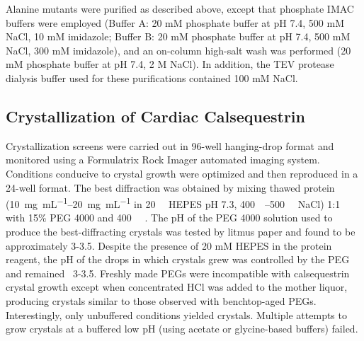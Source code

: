 Alanine mutants were purified as described above, except that phosphate IMAC buffers were employed (Buffer A: 20 mM phosphate buffer at pH 7.4, 500 mM NaCl, 10 mM imidazole; Buffer B: 20 mM phosphate buffer at pH 7.4, 500 mM NaCl, 300 mM imidazole), and an on-column high-salt wash was performed (20 mM phosphate buffer at pH 7.4, 2 M NaCl). In addition, the TEV protease dialysis buffer used for these purifications contained 100 mM NaCl.

\subsection*{Crystallization of Cardiac Calsequestrin}
Crystallization screens were carried out in 96-well hanging-drop format and monitored using a Formulatrix Rock Imager automated imaging system. Conditions conducive to crystal growth were optimized and then reproduced in a 24-well format. The best diffraction was obtained by mixing thawed protein (\SIrange[range-units = single]{10}{20}{\mg\per\milli\liter} in \SI{20}{\milli\Molar} HEPES pH 7.3, \SIrange[range-units = single]{400}{500}{\milli\Molar} NaCl) 1:1 with 15\% PEG 4000 and \SI{400}{\milli\Molar} . The pH of the PEG 4000 solution used to produce the best-diffracting crystals was tested by litmus paper and found to be approximately 3-3.5. Despite the presence of 20 mM HEPES in the protein reagent, the pH of the drops in which crystals grew was controlled by the PEG and remained ~3-3.5. Freshly made PEGs were incompatible with calsequestrin crystal growth except when concentrated HCl was added to the mother liquor, producing crystals similar to those observed with benchtop-aged PEGs. Interestingly, only unbuffered conditions yielded crystals. Multiple attempts to grow crystals at a buffered low pH (using acetate or glycine-based buffers) failed.

